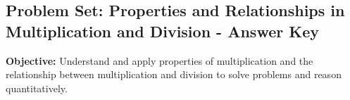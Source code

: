 \documentclass[12pt]{article}
\title{}
\date{}
\begin{document}
\subsection*{Problem Set: Properties and Relationships in Multiplication and Division - Answer Key}
\onehalfspacing

\begin{tcolorbox}[colframe=black!40, colback=gray!5, 
coltitle=black, colbacktitle=black!20, fonttitle=\bfseries\Large, 
title=Learning Objective, halign title=center, left=5pt, right=5pt, top=5pt, bottom=15pt]
\textbf{Objective:} Understand and apply properties of multiplication and the relationship between multiplication and division to solve problems and reason quantitatively.
\end{tcolorbox}

\end{document}
